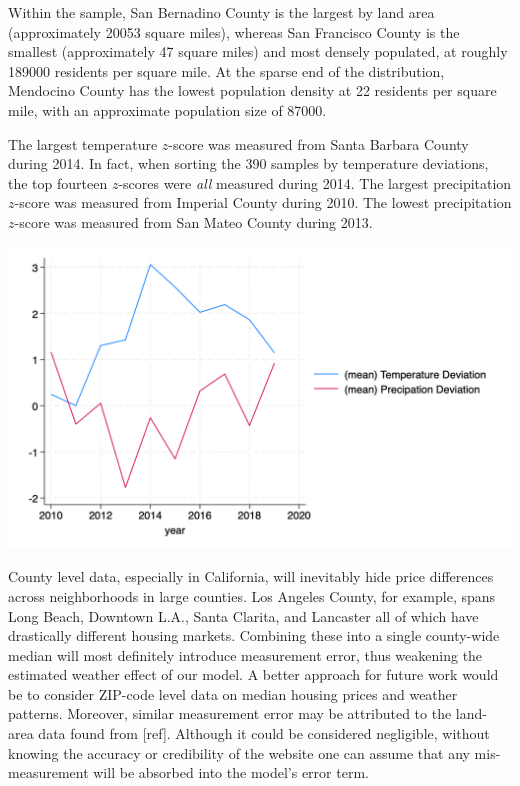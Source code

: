 \documentclass[12pt,reqno]{amsart}
\theoremstyle{definition}
\begin{document}
    

    Within the sample, San Bernadino County is the largest by land area (approximately 20053 square miles), whereas San Francisco County is the smallest (approximately 47 square miles) and most densely populated, at roughly 189000 residents per square mile. At the sparse end of the distribution, Mendocino County has the lowest population density at 22 residents per square mile, with an approximate population size of 87000.

    The largest temperature $z$-score was measured from Santa Barbara County during 2014. In fact, when sorting the 390 samples by temperature deviations, the top fourteen $z$-scores were \textit{all} measured during 2014. The largest precipitation $z$-score was measured from Imperial County during 2010. The lowest precipitation $z$-score was measured from San Mateo County during 2013.

    \begin{table}
        \includegraphics[scale=0.6]{avg_precip_temp_dev_year.png}
    \end{table}

    County level data, especially in California, will inevitably hide price differences across neighborhoods in large counties. Los Angeles County, for example, spans Long Beach, Downtown L.A., Santa Clarita, and Lancaster \textemdash all of which have drastically different housing markets. Combining these into a single county-wide median will most definitely introduce measurement error, thus weakening the estimated weather effect of our model. A better approach for future work would be to consider ZIP-code level data on median housing prices and weather patterns. Moreover, similar measurement error may be attributed to the land-area data found from [ref]. Although it could be considered negligible, without knowing the accuracy or credibility of the website one can assume that any mis-measurement will be absorbed into the model's error term. 
\end{document}
